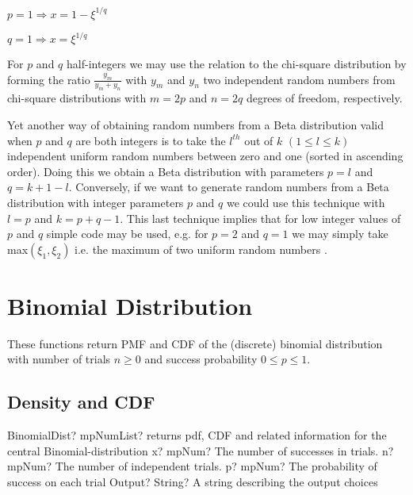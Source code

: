 \begin{center}
	
	$p = 1 \Rightarrow x = 1 - \xi^{1/q}$
	
	$q = 1 \Rightarrow x = \xi^{1/q}$
	
\end{center}


For $p$ and $q$ half-integers we may use the relation to the chi-square distribution by forming the ratio $\frac{y_m}{y_m + y_n}$ with $y_m$ and $y_n$ two independent random numbers from chi-square distributions with $m =2p$ and $n = 2q$ degrees of freedom, respectively.

Yet another way of obtaining random numbers from a Beta distribution valid when $p$ and $q$ are both integers is to take the $l^{th}$ out of $k$ $(1 \leq l \leq k)$ independent uniform random numbers between zero and one (sorted in ascending order). Doing this we obtain a Beta distribution with parameters $p = l$ and $q = k + 1 - l$. Conversely, if we want to generate random numbers from a Beta distribution with integer parameters $p$ and $q$ we could use this technique with $l = p$ and $k = p+q-1$. This last technique implies that for low integer
values of $p$ and $q$ simple code may be used, e.g. for $p = 2$ and $q = 1$ we may simply take max$(\xi_1, \xi_2)$ i.e. the maximum of two uniform random numbers \citep{walck_2007}.






\section{Binomial Distribution}
\label{BinomialDistribution}

These functions return PMF and CDF of the (discrete) binomial distribution with
number of trials $n \geq 0$ and success probability $0 \leq p\leq 1$.



\subsection{Density and CDF}

\begin{mpFunctionsExtract}
	\mpFunctionFour
	{BinomialDist? mpNumList? returns pdf, CDF and related information for the central Binomial-distribution}
	{x? mpNum? The number of successes in trials.}
	{n? mpNum? The number of independent trials.}
	{p? mpNum? The probability of success on each trial}
	{Output? String? A string describing the output choices}
\end{mpFunctionsExtract}



